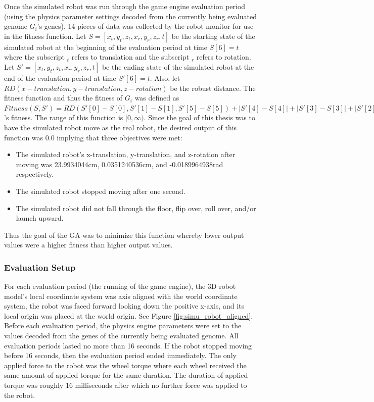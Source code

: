 Once the simulated robot was run through the game engine evaluation period (using the physics parameter settings decoded from the currently being evaluated genome $G_i$'s genes), 14 pieces of data was collected by the robot monitor for use in the fitness function. Let $S=[x_t,y_t,z_t,x_r,y_r,z_r,t]$ be the starting state of the simulated robot at the beginning of the evaluation period at time $S[6]=t$ where the subscript $_t$ refers to translation and the subscript $_r$ refers to rotation. Let $S'=[x_t,y_t,z_t,x_r,y_r,z_r,t]$ be the ending state of the simulated robot at the end of the evaluation period at time $S'[6]=t$. Also, let $RD(x-translation,y-translation,z-rotation)$ be the robust distance. The fitness function and thus the fitness of $G_i$ was defined as $Fitness(S,S')=RD(S'[0]-S[0],S'[1]-S[1],S'[5]-S[5])+|S'[4]-S[4]|+|S'[3]-S[3]|+|S'[2]-S[2]|+((S'[6]-S[6])-1)=G_i$'s fitness. The range of this function is $[0,\infty)$. Since the goal of this thesis was to have the simulated robot move as the real robot, the desired output of this function was $0.0$ implying that three objectives were met:
\begin{itemize}
 \item The simulated robot's x-translation, y-translation, and z-rotation after moving was 23.9934044cm, 0.0351240536cm, and -0.0189964938rad respectively.
 \item The simulated robot stopped moving after one second.
 \item The simulated robot did not fall through the floor, flip over, roll over, and/or launch upward.
\end{itemize}
Thus the goal of the GA was to minimize this function whereby lower output values were a higher fitness than higher output values.

\subsubsection{Evaluation Setup}

For each evaluation period (the running of the game engine), the 3D robot model's local coordinate system was axis aligned with the world coordinate system, the robot was faced forward looking down the positive x-axis, and its local origin was placed at the world origin. See Figure \ref{fig:simu_robot_aligned}. Before each evaluation period, the physics engine parameters were set to the values decoded from the genes of the currently being evaluated genome. All evaluation periods lasted no more than 16 seconds. If the robot stopped moving before 16 seconds, then the evaluation period ended immediately. The only applied force to the robot was the wheel torque where each wheel received the same amount of applied torque for the same duration. The duration of applied torque was roughly 16 milliseconds after which no further force was applied to the robot.

